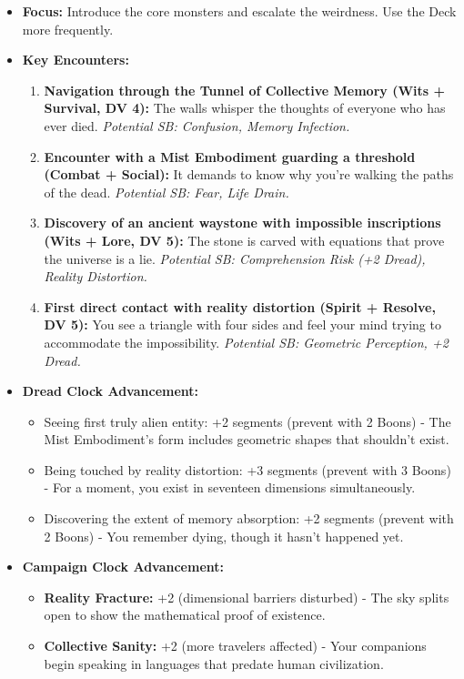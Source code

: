 \documentclass[11pt]{article}
\begin{document}
\begin{itemize}
\item \textbf{Focus:} Introduce the core monsters and escalate the weirdness. Use the Deck more frequently.
\item \textbf{Key Encounters:}
\begin{enumerate}
\item \textbf{Navigation through the Tunnel of Collective Memory (Wits + Survival, DV 4):} The walls whisper the thoughts of everyone who has ever died. \textit{Potential SB: Confusion, Memory Infection.}
\item \textbf{Encounter with a Mist Embodiment guarding a threshold (Combat + Social):} It demands to know why you're walking the paths of the dead. \textit{Potential SB: Fear, Life Drain.}
\item \textbf{Discovery of an ancient waystone with impossible inscriptions (Wits + Lore, DV 5):} The stone is carved with equations that prove the universe is a lie. \textit{Potential SB: Comprehension Risk (+2 Dread), Reality Distortion.}
\item \textbf{First direct contact with reality distortion (Spirit + Resolve, DV 5):} You see a triangle with four sides and feel your mind trying to accommodate the impossibility. \textit{Potential SB: Geometric Perception, +2 Dread.}
\end{enumerate}
\item \textbf{Dread Clock Advancement:}
\begin{itemize}
\item Seeing first truly alien entity: +2 segments (prevent with 2 Boons) - The Mist Embodiment's form includes geometric shapes that shouldn't exist.
\item Being touched by reality distortion: +3 segments (prevent with 3 Boons) - For a moment, you exist in seventeen dimensions simultaneously.
\item Discovering the extent of memory absorption: +2 segments (prevent with 2 Boons) - You remember dying, though it hasn't happened yet.
\end{itemize}
\item \textbf{Campaign Clock Advancement:}
\begin{itemize}
\item \textbf{Reality Fracture:} +2 (dimensional barriers disturbed) - The sky splits open to show the mathematical proof of existence.
\item \textbf{Collective Sanity:} +2 (more travelers affected) - Your companions begin speaking in languages that predate human civilization.
\end{itemize}
\end{itemize}
\end{document}
